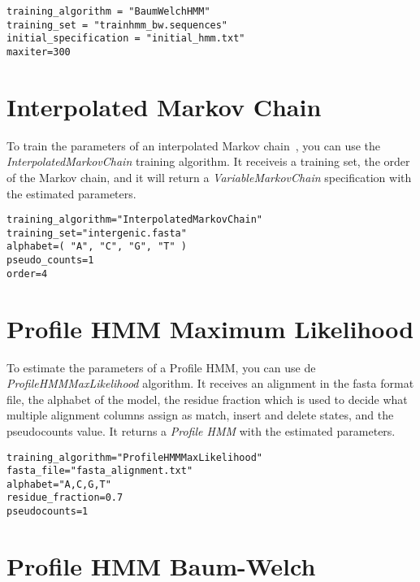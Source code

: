 \begin{Verbatim}[frame=single, label=train.txt]
training_algorithm = "BaumWelchHMM"
training_set = "trainhmm_bw.sequences"
initial_specification = "initial_hmm.txt"
maxiter=300
\end{Verbatim}



\section{Interpolated Markov Chain}

To train the parameters of an interpolated Markov chain~\cite{Salzberg1998}, you can use the \textit{InterpolatedMarkovChain} training algorithm. It receiveis a training set, the order of the Markov chain, and it will return a \textit{VariableMarkovChain} specification with the estimated parameters.

\begin{Verbatim}[frame=single,label=train.txt]
training_algorithm="InterpolatedMarkovChain"
training_set="intergenic.fasta"
alphabet=( "A", "C", "G", "T" )
pseudo_counts=1
order=4
\end{Verbatim}



\section{Profile HMM Maximum Likelihood}
To estimate the parameters of a Profile HMM, you can use de \textit{ProfileHMMMaxLikelihood} algorithm. It receives an alignment in the fasta format file, the alphabet of the model, the residue fraction which is used to decide what multiple alignment columns assign as match, insert and delete states, and the pseudocounts value. It returns a \textit{Profile HMM} with the estimated parameters.

\begin{Verbatim}[frame=single,label=train.txt]
training_algorithm="ProfileHMMMaxLikelihood"
fasta_file="fasta_alignment.txt"
alphabet="A,C,G,T"
residue_fraction=0.7
pseudocounts=1
\end{Verbatim}



\section{Profile HMM Baum-Welch}

